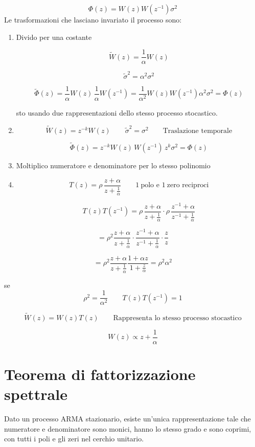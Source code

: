 \documentclass[11pt,a4paper]{article}
\begin{document}
\[
\Phi(z)=W(z)W(z^{-1})\sigma^2
\]
Le trasformazioni che lasciano invariato il processo sono:
\begin{enumerate}
\item Divido per una costante

\[
\tilde W(z)=\frac{1}{\alpha}W(z)
\]

\[
\tilde \sigma^2=\alpha^2\sigma^2
\]

\[
\tilde\Phi(z)=
\frac{1}{\alpha}W(z)\,
\frac{1}{\alpha}W(z^{-1})
=
\frac{1}{\alpha^2}W(z)W(z^{-1})\alpha^2\sigma^2
=
\Phi(z)
\]

sto usando due rappresentazioni dello stesso processo stocastico.

\item
\[
\tilde W(z)=z^{-k}W(z)
\qquad
\tilde \sigma^2=\sigma^2
\qquad
\text{Traslazione temporale}
\]

\[
\tilde\Phi(z)=
z^{-k}W(z)\,W(z^{-1})\,z^k\sigma^2
=
\Phi(z)
\]

\item Moltiplico numeratore e denominatore per lo stesso polinomio

\item
\[
T(z)=\rho\,\frac{z+\alpha}{z+\frac{1}{\alpha}}
\qquad
1\ \text{polo e } 
1\ \text{zero reciproci}
\]

\[
T(z)T(z^{-1})
=
\rho\,\frac{z+\alpha}{z+\frac{1}{\alpha}}
\cdot
\rho\,\frac{z^{-1}+\alpha}{z^{-1}+\frac{1}{\alpha}}
\]
\end{enumerate}



\[
=
\rho^2
\frac{z+\alpha}{z+\frac{1}{\alpha}}
\cdot
\frac{z^{-1}+\alpha}{z^{-1}+\frac{1}{\alpha}}
\cdot
\frac{z}{z}
\]

\[
=
\rho^2
\frac{z+\alpha}{z+\frac{1}{\alpha}}
\frac{1+\alpha z}{1+\frac{z}{\alpha}}
=
\rho^2 \alpha^2
\]

se
\[
\rho^2=\frac{1}{\alpha^2}
\qquad
T(z)T(z^{-1})=1
\]

\[
\tilde W(z)=W(z)T(z)
\qquad
\text{Rappresenta lo stesso processo stocastico}
\]

\[
W(z)\propto z+\frac{1}{\alpha}
\]





\section{Teorema di fattorizzazione spettrale}

Dato un processo ARMA stazionario, esiste un'unica rappresentazione tale che numeratore e denominatore sono monici, hanno lo stesso grado e sono coprimi, con tutti i poli e gli zeri nel cerchio unitario.
\end{document}
